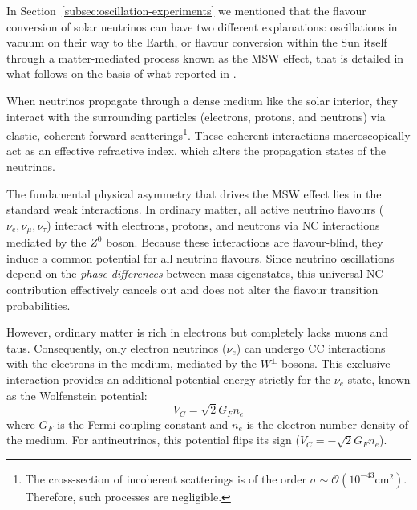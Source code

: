 In Section~\ref{subsec:oscillation-experiments} we mentioned that the flavour conversion of solar neutrinos can have two different explanations: oscillations in vacuum on their way to the Earth, or flavour conversion within the Sun itself through a matter-mediated process known as the \ac{MSW} effect, that is detailed in what follows on the basis of what reported in \cite{neutrinosPDG}.

When neutrinos propagate through a dense medium like the solar interior, they interact with the surrounding particles (electrons, protons, and neutrons) via elastic, coherent forward scatterings\footnote{The cross-section of incoherent scatterings is of the order $\sigma \sim \mathcal{O}(10^{-43}\text{cm}^2)$. Therefore, such processes are negligible.}. These coherent interactions macroscopically act as an effective refractive index, which alters the propagation states of the neutrinos.

The fundamental physical asymmetry that drives the \ac{MSW} effect lies in the standard weak interactions. In ordinary matter, all active neutrino flavours ($\nu_e, \nu_\mu, \nu_\tau$) interact with electrons, protons, and neutrons via \ac{NC} interactions mediated by the $Z^0$ boson. Because these interactions are flavour-blind, they induce a common potential for all neutrino flavours. Since neutrino oscillations depend on the \textit{phase differences} between mass eigenstates, this universal \ac{NC} contribution effectively cancels out and does not alter the flavour transition probabilities.

However, ordinary matter is rich in electrons but completely lacks muons and taus. Consequently, only electron neutrinos ($\nu_e$) can undergo \ac{CC} interactions with the electrons in the medium, mediated by the $W^\pm$ bosons. This exclusive interaction provides an additional potential energy strictly for the $\nu_e$ state, known as the Wolfenstein potential:
\begin{equation}
    V_C = \sqrt{2} G_F n_e
\end{equation}
where $G_F$ is the Fermi coupling constant and $n_e$ is the electron number density of the medium. For antineutrinos, this potential flips its sign ($V_C = -\sqrt{2} G_F n_e$).

